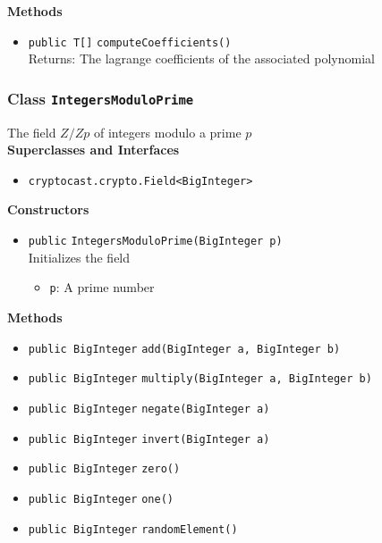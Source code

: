 \textbf{Methods}
\begin{itemize}
\item \lstinline|public T[]| \lstinline|computeCoefficients|\lstinline|()|\\
Returns: The lagrange coefficients of the associated polynomial



\end{itemize}

\subsubsection{Class \lstinline|IntegersModuloPrime|}
The field $Z/Zp$ of integers modulo a prime $p$ \\


\textbf{Superclasses and Interfaces}
\begin{itemize}
\item \lstinline|cryptocast.crypto.Field<BigInteger>|
\end{itemize}



\textbf{Constructors}
\begin{itemize}
\item \lstinline|public| \lstinline|IntegersModuloPrime|\lstinline|(BigInteger p)|\\
Initializes the field
\begin{itemize}
\item \lstinline|p|: A prime number
\end{itemize}



\end{itemize}


\textbf{Methods}
\begin{itemize}
\item \lstinline|public BigInteger| \lstinline|add|\lstinline|(BigInteger a, BigInteger b)|




\item \lstinline|public BigInteger| \lstinline|multiply|\lstinline|(BigInteger a, BigInteger b)|




\item \lstinline|public BigInteger| \lstinline|negate|\lstinline|(BigInteger a)|




\item \lstinline|public BigInteger| \lstinline|invert|\lstinline|(BigInteger a)|




\item \lstinline|public BigInteger| \lstinline|zero|\lstinline|()|




\item \lstinline|public BigInteger| \lstinline|one|\lstinline|()|




\item \lstinline|public BigInteger| \lstinline|randomElement|\lstinline|()|




\end{itemize}

